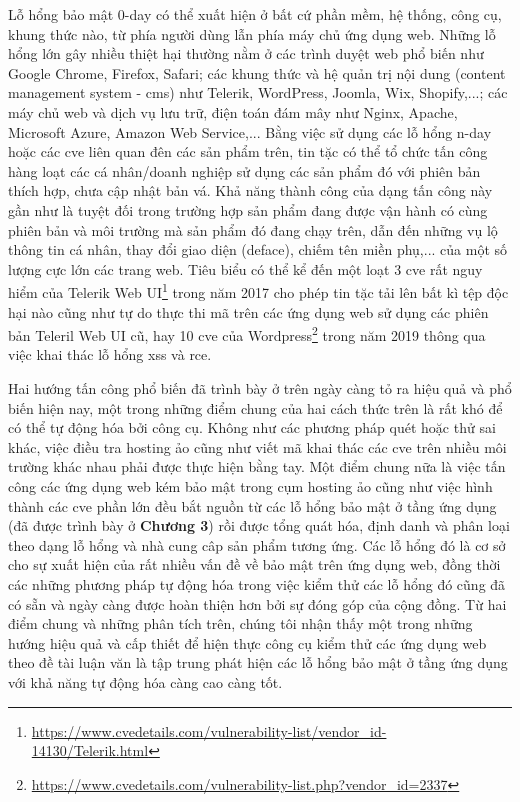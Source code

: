 Lỗ hổng bảo mật 0-day có thể xuất hiện ở bất cứ phần mềm, hệ thống, công cụ, khung thức nào, từ phía người dùng lẫn phía máy chủ ứng dụng web. Những lỗ hổng lớn gây nhiều thiệt hại thường nằm ở các trình duyệt web phổ biến như Google Chrome, Firefox, Safari; các khung thức và hệ quản trị nội dung (content management system - \acrshort{cms}) như Telerik, WordPress, Joomla, Wix, Shopify,...; các máy chủ web và dịch vụ lưu trữ, điện toán đám mây như Nginx, Apache, Microsoft Azure, Amazon Web Service,... Bằng việc sử dụng các lỗ hổng n-day hoặc các \acrshort{cve} liên quan đên các sản phẩm trên, tin tặc có thể tổ chức tấn công hàng loạt các cá nhân/doanh nghiệp sử dụng các sản phẩm đó với phiên bản thích hợp, chưa cập nhật bản vá. Khả năng thành công của dạng tấn công này gần như là tuyệt đối trong trường hợp sản phẩm đang được vận hành có cùng phiên bản và môi trường mà sản phẩm đó đang chạy trên, dẫn đến những vụ lộ thông tin cá nhân, thay đổi giao diện (deface), chiếm tên miền phụ,... của một số lượng cực lớn các trang web. Tiêu biểu có thể kể đến một loạt 3 \acrshort{cve} rất nguy hiểm của Telerik Web UI\footnote{\href{https://www.cvedetails.com/vulnerability-list/vendor_id-14130/Telerik.html}{https://www.cvedetails.com/vulnerability-list/vendor_id-14130/Telerik.html}} trong năm 2017 cho phép tin tặc tải lên bất kì tệp độc hại nào cũng như tự do thực thi mã trên các ứng dụng web sử dụng các phiên bản Teleril Web UI cũ, hay 10 \acrshort{cve} của Wordpress\footnote{\href{https://www.cvedetails.com/vulnerability-list.php?vendor_id=2337}{https://www.cvedetails.com/vulnerability-list.php?vendor_id=2337}} trong năm 2019 thông qua việc khai thác lỗ hổng \acrshort{xss} và \acrshort{rce}.\par
Hai hướng tấn công phổ biến đã trình bày ở trên ngày càng tỏ ra hiệu quả và phổ biến hiện nay, một trong những điểm chung của hai cách thức trên là rất khó để có thể tự động hóa bởi công cụ. Không như các phương pháp quét hoặc thử sai khác, việc điều tra hosting ảo cũng như viết mã khai thác các \acrshort{cve} trên nhiều môi trường khác nhau phải được thực hiện bằng tay. Một điểm chung nữa là việc tấn công các ứng dụng web kém bảo mật trong cụm hosting ảo cũng như việc hình thành các \acrshort{cve} phần lớn đều bắt nguồn từ các lỗ hổng bảo mật ở tầng ứng dụng (đã được trình bày ở \textbf{Chương 3}) rồi được tổng quát hóa, định danh và phân loại theo dạng lỗ hổng và nhà cung câp sản phẩm tương ứng. Các lỗ hổng đó là cơ sở cho sự xuất hiện của rất nhiều vấn đề về bảo mật trên ứng dụng web, đồng thời các những phương pháp tự động hóa trong việc kiểm thử các lỗ hổng đó cũng đã có sẵn và ngày càng được hoàn thiện hơn bởi sự đóng góp của cộng đồng. Từ hai điểm chung và những phân tích trên, chúng tôi nhận thấy một trong những hướng hiệu quả và cấp thiết để hiện thực công cụ kiểm thử các ứng dụng web theo đề tài luận văn là tập trung phát hiện các lỗ hổng bảo mật ở tầng ứng dụng với khả năng tự động hóa càng cao càng tốt.
